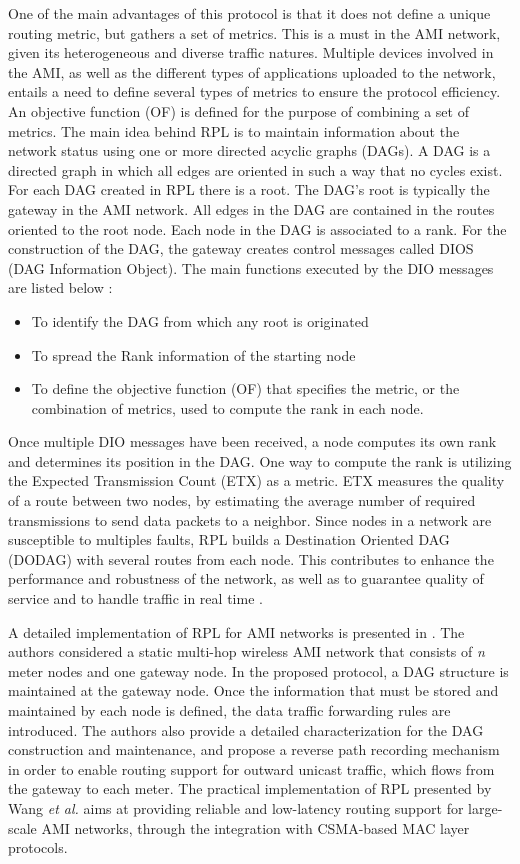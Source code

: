 \documentclass[10pt,twocolumn,twoside,submit]{JCNtran}
\begin{document}
One of the main advantages of this protocol is that it does not define a unique routing metric, but gathers a set of metrics. This is a must in the AMI network, given its heterogeneous and diverse traffic natures. Multiple devices involved in the AMI, as well as the different types of applications uploaded to the network, entails a need to define several types of metrics to ensure the protocol efficiency. An objective function (OF) is defined for the purpose of combining a set of metrics. The main idea behind RPL is to maintain information about the network status using one or more directed acyclic graphs (DAGs). A DAG is a directed graph in which all edges are oriented in such a way that no cycles exist. For each DAG created in RPL there is a root. The DAG’s root is typically the gateway in the AMI network. All edges in the DAG are contained in the routes oriented to the root node. Each node in the DAG is associated to a rank. For the construction of the DAG, the gateway creates control messages called DIOS (DAG Information Object). The main functions executed by the DIO messages are listed below  \cite{Iyer2011a}:

\begin{itemize}
	\item To identify the DAG from which any root is originated
	\item To spread the Rank information of the starting node
	\item To define the objective function (OF) that specifies the metric, or the combination of metrics, used to compute the rank in each node.
\end{itemize}

Once multiple DIO messages have been received, a node computes its own rank and determines its position in the DAG. One way to compute the rank is utilizing the Expected Transmission Count (ETX) as a metric. ETX measures the quality of a route between two nodes, by estimating the average number of required transmissions to send data packets to a neighbor. Since nodes in a network are susceptible to multiples faults, RPL builds a Destination Oriented DAG (DODAG) with several routes from each node. This contributes to enhance the performance and robustness of the network, as well as to guarantee quality of service and to handle traffic in real time  \cite{Pavkovic2011}.

A detailed implementation of RPL for AMI networks is presented in \cite{Wang2010}. The authors considered a static multi-hop wireless AMI network that consists of \textit{n} meter nodes and one gateway node. In the proposed protocol, a DAG structure is maintained at the gateway node. Once the information that must be stored and maintained by each node is defined, the data traffic forwarding rules are introduced. The authors also provide a detailed characterization for the DAG construction and maintenance, and propose a reverse path recording mechanism in order to enable routing support for outward unicast traffic, which flows from the gateway to each meter. The practical implementation of RPL presented by Wang \textit{et al.} aims at providing reliable and low-latency routing support for large-scale AMI networks, through the integration with CSMA-based MAC layer protocols. 
\end{document}
